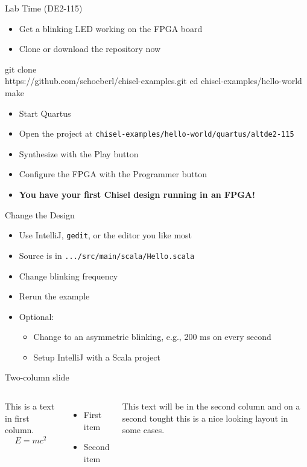 \documentclass[xcolor=pdflatex,dvipsnames,table]{beamer}
\newcommand{\code}[1]{{\texttt{#1}}}
\begin{document}
\begin{frame}[fragile]{Lab Time (DE2-115)}
\begin{itemize}
\item Get a blinking LED working on the FPGA board
\item Clone or download the repository now
\end{itemize}
\begin{chisel}
git clone \\
   https://github.com/schoeberl/chisel-examples.git
cd chisel-examples/hello-world
make
\end{chisel}
\begin{itemize}
\item Start Quartus
\item Open the project at \code{chisel-examples/hello-world/quartus/altde2-115}
\item Synthesize with the Play button
\item Configure the FPGA with the Programmer button
\item {\bf You have your first Chisel design running in an FPGA!}
\end{itemize}
\end{frame}


\begin{frame}[fragile]{Change the Design}
\begin{itemize}
\item Use IntelliJ, \code{gedit}, or the editor you like most
\item Source is in \code{.../src/main/scala/Hello.scala}
\item Change blinking frequency
\item Rerun the example
\item Optional:
\begin{itemize}
\item Change to an asymmetric blinking, e.g., 200 ms on every second 
\item Setup IntelliJ with a Scala project 
\end{itemize}
\end{itemize}
\end{frame}

\begin{frame}{Two-column slide}
 
\begin{columns}
 
This is a text in first column.
$$E=mc^2$$
\begin{itemize}
\item First item
\item Second item
\end{itemize}
 
This text will be in the second column
and on a second tought this is a nice looking
layout in some cases.
\end{columns}
\end{frame}
\end{document}
